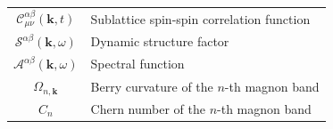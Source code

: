 \documentclass[aps, prx, nofootinbib, preprintnumbers, superscriptaddress]{revtex4-2}
\begin{document}
\begin{table}[!h]
\begin{tabular}{c|p{14cm}}
    $\mathcal{C}^{\alpha\beta}_{\mu\nu}(\mathbf{k}, t)$ & Sublattice spin-spin correlation function \\
    $\mathcal{S}^{\alpha\beta}(\mathbf{k}, \omega)$ & Dynamic structure factor \\
    $\mathcal{A}^{\alpha\beta}(\mathbf{k}, \omega)$ & Spectral function \\
    $\Omega_{n,\mathbf{k}}$ & Berry curvature of the $n$-th magnon band \\
    $C_n$ & Chern number of the $n$-th magnon band \\
    \hline\hline
    \end{tabular}
\end{table}

\newpage
\end{document}
